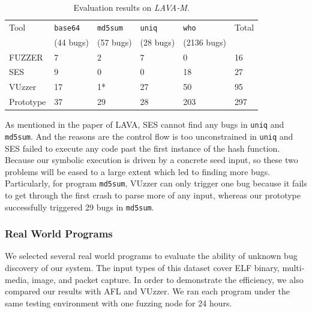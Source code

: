 \begin{table}
  \caption{\label{LAVA-M}Evaluation results on \textit{LAVA-M}.}
  \centering
	\begin{tabular}{p{2cm}<{\centering} p{1.5cm}<{\centering} p{1.5cm}<{\centering}  p{1.5cm}<{\centering} p{1.8cm}<{\centering}  p{1.5cm}<{\centering} }
		\toprule
	    Tool & \texttt{base64} & \texttt{md5sum} & \texttt{uniq} & \texttt{who} & Total  \\
	         & (44 bugs) & (57 bugs) & (28 bugs) & (2136 bugs) &  \\
		\midrule
		FUZZER 		& 7  & 2  & 7    & 0   & 16  \\
		SES	        & 9  & 0  & 0    & 18  & 27  \\
		VUzzer		& 17 & 1* & 27   & 50  & 95 \\
		Prototype	& 37 & 29 & 28   & 203 & 297 \\
	 \bottomrule
	\end{tabular}
\end{table}

As mentioned in the paper of LAVA, SES cannot find any bugs in \texttt{uniq} and \texttt{md5sum}. And the reasons are the control flow is too unconstrained in \texttt{uniq} and SES failed to execute any code past the first instance of the hash function. Because our symbolic execution is driven by a concrete seed input, so these two problems will be eased to a large extent which led to finding more bugs. Particularly, for program \texttt{md5sum}, VUzzer can only trigger one bug because it fails to get through the first crash to parse more of any input, whereas our prototype successfully triggered 29 bugs in \texttt{md5sum}.

\subsubsection{Real World Programs}
We selected several real world programs to evaluate the ability of unknown bug discovery of our system. The input types of this dataset cover ELF binary, multi-media, image, and packet capture. In order to demonstrate the efficiency, we also compared our results with AFL and VUzzer. We ran each program under the same testing environment with one fuzzing node for 24 hours. 

